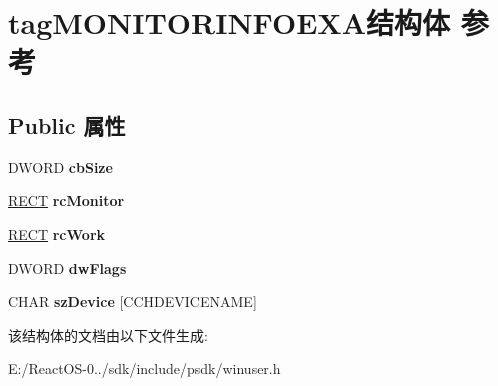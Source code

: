 \hypertarget{structtag_m_o_n_i_t_o_r_i_n_f_o_e_x_a}{}\section{tag\+M\+O\+N\+I\+T\+O\+R\+I\+N\+F\+O\+E\+X\+A结构体 参考}
\label{structtag_m_o_n_i_t_o_r_i_n_f_o_e_x_a}
\subsection*{Public 属性}
\begin{DoxyCompactItemize}
\item 
\mbox{\label{structtag_m_o_n_i_t_o_r_i_n_f_o_e_x_a_a054596df335824408d8ed9c7ee3bc3c5}} 
D\+W\+O\+RD {\bfseries cb\+Size}
\item 
\mbox{\label{structtag_m_o_n_i_t_o_r_i_n_f_o_e_x_a_a2b32f340ad910fbac53b99ba033f2032}} 
\hyperlink{structtag_r_e_c_t}{R\+E\+CT} {\bfseries rc\+Monitor}
\item 
\mbox{\label{structtag_m_o_n_i_t_o_r_i_n_f_o_e_x_a_accae978edfcde616ca83962bb1d6886a}} 
\hyperlink{structtag_r_e_c_t}{R\+E\+CT} {\bfseries rc\+Work}
\item 
\mbox{\label{structtag_m_o_n_i_t_o_r_i_n_f_o_e_x_a_a952f59b68675dfa53ea1526ec4d43c0a}} 
D\+W\+O\+RD {\bfseries dw\+Flags}
\item 
\mbox{\label{structtag_m_o_n_i_t_o_r_i_n_f_o_e_x_a_af347f699609f5620bfd626f7845e3276}} 
C\+H\+AR {\bfseries sz\+Device} \mbox{[}C\+C\+H\+D\+E\+V\+I\+C\+E\+N\+A\+ME\mbox{]}
\end{DoxyCompactItemize}


该结构体的文档由以下文件生成\+:\begin{DoxyCompactItemize}
\item 
E\+:/\+React\+O\+S-\/0../sdk/include/psdk/winuser.\+h\end{DoxyCompactItemize}
